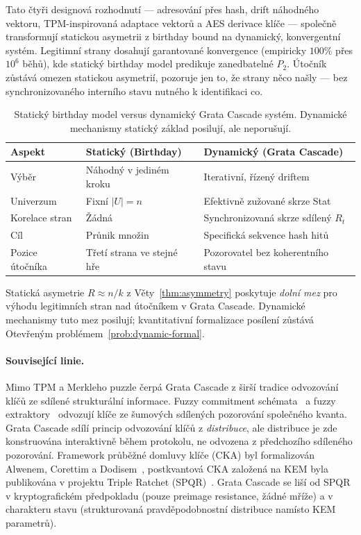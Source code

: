 \documentclass[11pt,a4paper]{article}
\begin{document}
Tato čtyři designová rozhodnutí --- adresování přes hash, drift náhodného vektoru, TPM-inspirovaná adaptace vektorů a AES derivace klíče --- společně transformují statickou asymetrii z birthday bound na dynamický, konvergentní systém. Legitimní strany dosahují garantované konvergence (empiricky $100\%$ přes $10^6$ běhů), kde statický birthday model predikuje zanedbatelné $P_2$. Útočník zůstává omezen statickou asymetrií, pozoruje jen to, že strany něco našly --- bez synchronizovaného interního stavu nutného k identifikaci co.

\begin{table}[ht]
\centering
\small
\begin{tabular}{lll}
\toprule
Aspekt & Statický (Birthday) & Dynamický (Grata Cascade) \\
\midrule
Výběr & Náhodný v jediném kroku & Iterativní, řízený driftem \\
Univerzum & Fixní $|U| = n$ & Efektivně zužované skrze Stat \\
Korelace stran & Žádná & Synchronizovaná skrze sdílený $R_t$ \\
Cíl & Průnik množin & Specifická sekvence hash hitů \\
Pozice útočníka & Třetí strana ve stejné hře & Pozorovatel bez koherentního stavu \\
\bottomrule
\end{tabular}
\caption{Statický birthday model versus dynamický Grata Cascade systém. Dynamické mechanismy statický základ posilují, ale neporušují.}
\label{tab:static-vs-dynamic}
\end{table}

Statická asymetrie $R \approx n/k$ z Věty~\ref{thm:asymmetry} poskytuje \emph{dolní mez} pro výhodu legitimních stran nad útočníkem v Grata Cascade. Dynamické mechanismy tuto mez posilují; kvantitativní formalizace posílení zůstává Otevřeným problémem~\ref{prob:dynamic-formal}.

\paragraph{Související linie.} Mimo TPM a Merkleho puzzle čerpá Grata Cascade z širší tradice odvozování klíčů ze sdílené strukturální informace. Fuzzy commitment schémata~\cite{JW1999} a fuzzy extraktory~\cite{Dodis2004} odvozují klíče ze šumových sdílených pozorování společného kvanta. Grata Cascade sdílí princip odvozování klíčů z \emph{distribuce}, ale distribuce je zde konstruována interaktivně během protokolu, ne odvozena z předchozího sdíleného pozorování. Framework průběžné domluvy klíče (CKA) byl formalizován Alwenem, Corettim a Dodisem~\cite{ACD19}, postkvantová CKA založená na KEM byla publikována v projektu Triple Ratchet (SPQR)~\cite{SPQR2025}. Grata Cascade se liší od SPQR v kryptografickém předpokladu (pouze preimage resistance, žádné mříže) a v charakteru stavu (strukturovaná pravděpodobnostní distribuce namísto KEM parametrů).
\end{document}
